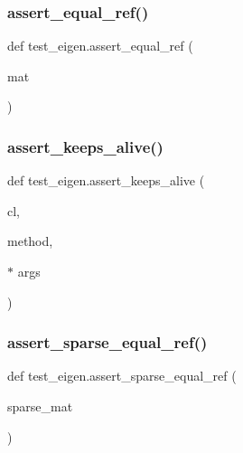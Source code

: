 \mbox{\label{namespacetest__eigen_a7a3cfeee03efbbfce74f57b2b0674ef5}} 
\subsubsection{\texorpdfstring{assert\_equal\_ref()}{assert\_equal\_ref()}}
{\footnotesize\ttfamily def test\+\_\+eigen.\+assert\+\_\+equal\+\_\+ref (\begin{DoxyParamCaption}\item[{}]{mat }\end{DoxyParamCaption})}

\mbox{\label{namespacetest__eigen_a9b02a089f59e0c07c01c2e43000c2558}} 
\subsubsection{\texorpdfstring{assert\_keeps\_alive()}{assert\_keeps\_alive()}}
{\footnotesize\ttfamily def test\+\_\+eigen.\+assert\+\_\+keeps\+\_\+alive (\begin{DoxyParamCaption}\item[{}]{cl,  }\item[{}]{method,  }\item[{$\ast$}]{args }\end{DoxyParamCaption})}

\mbox{\label{namespacetest__eigen_a1335cc38a01e48410a2e8350975aa00f}} 
\subsubsection{\texorpdfstring{assert\_sparse\_equal\_ref()}{assert\_sparse\_equal\_ref()}}
{\footnotesize\ttfamily def test\+\_\+eigen.\+assert\+\_\+sparse\+\_\+equal\+\_\+ref (\begin{DoxyParamCaption}\item[{}]{sparse\+\_\+mat }\end{DoxyParamCaption})}

